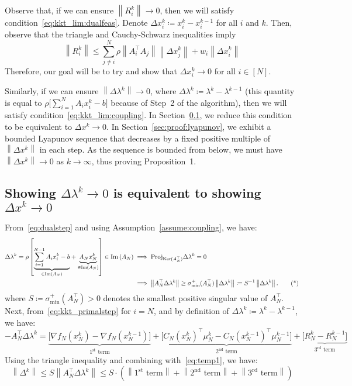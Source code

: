 \documentclass[11pt]{article}
\newcommand{\Image}[1]{\mathop{\text{Im}}\left(#1\right)}
\newcommand{\norm}[1]{\left\lVert #1 \right\rVert}
\begin{document}
Observe that, if we can ensure $\norm{R_i^k} \to 0$, then we will satisfy condition~\eqref{eq:kkt_lim:dualfeas}.
Denote $\Delta x_i^k \coloneqq x_i^k - x_i^{k - 1}$ for all $i$ and $k$. Then, observe that the triangle and Cauchy-Schwarz inequalities imply 
\begin{equation*}
\norm{R_i^k} \leq  \sum_{j \neq i}^N \rho \norm{A_i^\top A_j} \norm{\Delta x_j^k} + w_i\norm{\Delta x_i^k}
\end{equation*}
Therefore, our goal will be to try and show that $\Delta x_i^k \to 0$ for all $i \in [N]$.

Similarly, if we can ensure $\norm{\Delta \lambda^k} \to 0$, where $\Delta \lambda^k \coloneqq \lambda^k - \lambda^{k-1}$ (this quantity is equal to $\rho \big[\sum_{i = 1}^N A_i x_i^k - b\big]$ because of Step~2 of the algorithm), then we will satisfy condition~\eqref{eq:kkt_lim:coupling}.
In Section~\ref{sec:proof:lambda_to_x}, we reduce this condition to be equivalent to $\Delta x^k \to 0$.
In Section~\ref{sec:proof:lyapunov}, we exhibit a bounded Lyapunov sequence that decreases by a fixed positive multiple of $\norm{\Delta x^k}$ in each step.
As the sequence is bounded from below, we must have $\norm{\Delta x^k} \to 0$ as $k \to \infty$, thus proving Proposition~1.

\subsection{Showing $\Delta \lambda^k \to 0$ is equivalent to showing $\Delta x^k \to 0$}\label{sec:proof:lambda_to_x}
From~\eqref{eq:dualstep} and using Assumption~\ref{assume:coupling}, we have:
\begin{align}
\Delta \lambda^k = \rho\left[\underset{\in \Image{A_N}}{\underbrace{\sum_{i = 1}^{N-1} A_ix_i^k - b}} + \underset{\in \Image{A_N}}{\underbrace{A_N x_N^k}}\right] \in \Image{A_N}
&\implies \text{Proj}_{\text{Ker}(A_N^\top)} \Delta \lambda^k = 0 \notag \\
&\implies \norm{A_N^\top \Delta \lambda^k} \geq \sigma^{+}_{\text{min}}(A_N^\top) \norm{\Delta \lambda^k} \coloneqq S^{-1} \norm{\Delta \lambda^k}. \tag{*} \label{eq:temp1}
\end{align}
where $S \coloneqq \sigma^{+}_{\text{min}}(A_N^\top) > 0$ denotes the smallest positive singular value of $A_N^\top$.
Next, from~\eqref{eq:kkt_primalstep} for $i = N$, and by definition of $\Delta \lambda^k \coloneqq \lambda^k - \lambda^{k-1}$, we have:
\begin{equation*}
-A_N^\top \Delta \lambda^k =
\underset{1^\text{st} \text{ term}}{\underbrace{\big[\nabla f_N(x_N^k) - \nabla f_N(x_N^{k-1})\big]}}
+ \underset{2^\text{nd} \text{ term}}{\underbrace{\big[C_N(x_N^k)^\top \mu_N^k - C_N(x_N^{k-1})^\top \mu_N^{k-1}\big]}}
+ \underset{3^\text{rd} \text{ term}}{\underbrace{\big[R_N^k - R_N^{k-1}\big]}}
\end{equation*}
Using the triangle inequality and combining with~\eqref{eq:temp1}, we have:
\begin{equation*}
\norm{\Delta^k} \leq S\norm{A_N^\top \Delta \lambda^k} \leq S\cdot\left(\norm{1^\text{st} \text{ term}} + \norm{2^\text{nd} \text{ term}} + \norm{3^\text{rd} \text{ term}}\right)
\end{equation*}
\end{document}
